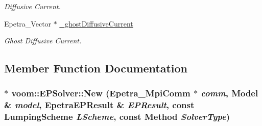 \begin{DoxyCompactItemize}
\begin{DoxyCompactList}\small\item\em Diffusive Current. \item\end{DoxyCompactList}\item 
\hypertarget{classvoom_1_1_e_p_solver_ab89da926f7819a041272cfacc9a11dde}{
Epetra\_\-Vector $\ast$ \hyperlink{classvoom_1_1_e_p_solver_ab89da926f7819a041272cfacc9a11dde}{\_\-ghostDiffusiveCurrent}}
\label{classvoom_1_1_e_p_solver_ab89da926f7819a041272cfacc9a11dde}

\begin{DoxyCompactList}\small\item\em Ghost Diffusive Current. \item\end{DoxyCompactList}\end{DoxyCompactItemize}


\subsection{Member Function Documentation}
\hypertarget{classvoom_1_1_e_p_solver_a29e58f5a19d262fb808351f772547bef}{
\subsubsection[{New}]{ $\ast$ voom::EPSolver::New (Epetra\_\-MpiComm $\ast$ {\em comm}, \/  {\bf Model} \& {\em model}, \/  {\bf EpetraEPResult} \& {\em EPResult}, \/  const {\bf LumpingScheme} {\em LScheme}, \/  const {\bf Method} {\em SolverType})}}
\label{classvoom_1_1_e_p_solver_a29e58f5a19d262fb808351f772547bef}


